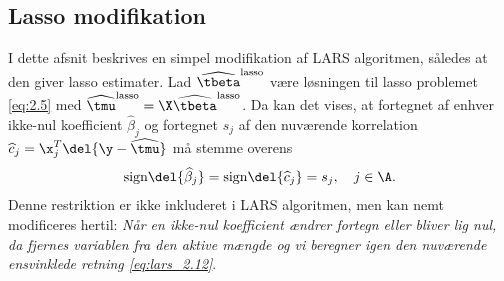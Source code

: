 \subsection{Lasso modifikation} \label{subsec:lasso_modifikation}
I dette afsnit beskrives en simpel modifikation af LARS algoritmen, således at den giver lasso estimater.
Lad \(\widehat{\tbeta}^\text{lasso}\) være løsningen til lasso problemet \eqref{eq:2.5} med \(\widehat{\tmu}^\text{lasso} = \X \widehat{\tbeta}^\text{lasso}\).
Da kan det vises, at fortegnet af enhver ikke-nul koefficient \(\widehat{\beta}_j\) og fortegnet \(s_j\) af den nuværende korrelation \(\widehat{c}_j = \x_j^T \del{\y - \widehat{\tmu}}\) må stemme overens
\begin{align}
\text{sign} \del{\widehat{\beta}_j } = \text{sign} \del{\widehat{c}_j } = s_j, \quad j \in \A. \label{eq:lars_3.1}
\end{align}
%
%
Denne restriktion er ikke inkluderet i LARS algoritmen, men kan nemt modificeres hertil:
\textit{Når en ikke-nul koefficient ændrer fortegn eller bliver lig nul, da fjernes variablen fra den aktive mængde og vi beregner igen den nuværende ensvinklede retning \eqref{eq:lars_2.12}}.

